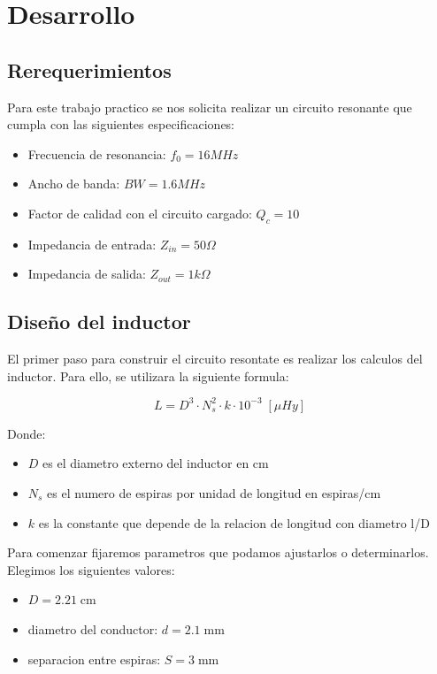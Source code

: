 \section{Desarrollo}

\subsection{Rerequerimientos}

Para este trabajo practico se nos solicita realizar un circuito resonante que cumpla con las siguientes especificaciones:

\begin{itemize}
    \item Frecuencia de resonancia: $f_0 = 16 MHz$
    \item Ancho de banda: $BW = 1.6 MHz$
    \item Factor de calidad con el circuito cargado: $Q_c = 10$
    \item Impedancia de entrada: $Z_{in} = 50 \Omega$
    \item Impedancia de salida: $Z_{out} = 1 k\Omega$
\end{itemize}

\subsection{Diseño del inductor}

El primer paso para construir el circuito resontate es realizar los calculos del inductor. Para ello, se utilizara la siguiente formula:

\begin{equation}
    L = D^3 \cdot N_s^2 \cdot k \cdot 10^{-3}\; [\mu Hy]
\end{equation}

Donde:

\begin{itemize}
    \item $D$ es el diametro externo del inductor en cm 
    \item $N_s$ es el numero de espiras por unidad de longitud en espiras/cm
    \item $k$ es la constante que depende de la relacion de longitud con diametro l/D
\end{itemize}

Para comenzar fijaremos parametros que podamos ajustarlos o determinarlos. Elegimos los siguientes valores:

\begin{itemize}
    \item $D =  2.21\; \text{cm}$
    \item diametro del conductor: $d = 2.1\; \text{mm}$
    \item separacion entre espiras: $S = 3\; \text{mm}$
\end{itemize}

